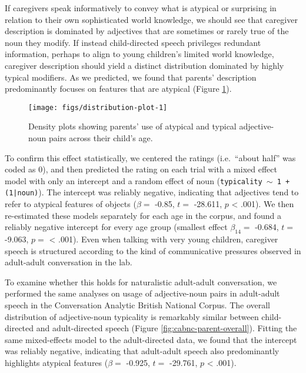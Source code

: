 \documentclass{ucetd}
\begin{document}
If caregivers speak informatively to convey what is atypical or
surprising in relation to their own sophisticated world knowledge, we
should see that caregiver description is dominated by adjectives that
are sometimes or rarely true of the noun they modify. If instead
child-directed speech privileges redundant information, perhaps to align
to young children's limited world knowledge, caregiver description
should yield a distinct distribution dominated by highly typical
modifiers. As we predicted, we found that parents' description
predominantly focuses on features that are atypical (Figure
\ref{fig:distribution-plot}).

\begin{figure}[tb]

{\centering \texttt{[image: figs/distribution-plot-1]} 

}

\caption{Density plots showing parents' use of atypical and typical adjective-noun pairs across their child's age.}\label{fig:distribution-plot}
\end{figure}

To confirm this effect statistically, we centered the ratings
(i.e.~``about half'' was coded as 0), and then predicted the rating on
each trial with a mixed effect model with only an intercept and a random
effect of noun (\texttt{typicality $\sim$ 1 + (1|noun)}). The intercept
was reliably negative, indicating that adjectives tend to refer to
atypical features of objects (\(\beta =\) -0.85, \(t =\) -28.611, \(p\)
\textless{} .001). We then re-estimated these models separately for each
age in the corpus, and found a reliably negative intercept for every age
group (smallest effect \(\beta_{14} =\) -0.684, \(t =\) -9.063, \(p =\)
\textless{} .001). Even when talking with very young children, caregiver
speech is structured according to the kind of communicative pressures
observed in adult-adult conversation in the lab.

To examine whether this holds for naturalistic adult-adult conversation,
we performed the same analyses on usage of adjective-noun pairs in
adult-adult speech in the Conversation Analytic British National Corpus.
The overall distribution of adjective-noun typicality is remarkably
similar between child-directed and adult-directed speech (Figure
\ref{fig:cabnc-parent-overall}). Fitting the same mixed-effects model to
the adult-directed data, we found that the intercept was reliably
negative, indicating that adult-adult speech also predominantly
highlights atypical features (\(\beta =\) -0.925, \(t =\) -29.761, \(p\)
\textless{} .001).
\end{document}
